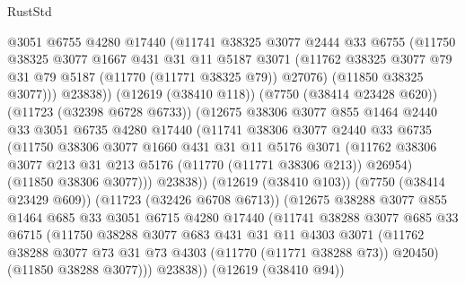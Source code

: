 \begin{lexlean}{RustStd}
\begin{coremodule}
                    @3051
                    @6755
                    @4280
                    @17440
                    (@11741
                      @38325
                      @3077
                      @2444
                      @33
                      @6755
                      (@11750
                        @38325
                        @3077
                        @1667
                        @431
                        @31
                        @11
                        @5187
                        @3071
                        (@11762 @38325 @3077 @79 @31 @79 @5187 (@11770 (@11771 @38325 @79)) @27076)
                        (@11850 @38325 @3077)))
                    @23838))
                (@12619 (@38410 @118))
                (@7750 (@38414 @23428 @620))
                (@11723 (@32398 @6728 @6733))
                (@12675
                  @38306
                  @3077
                  @855
                  @1464
                  @2440
                  @33
                  @3051
                  @6735
                  @4280
                  @17440
                  (@11741
                    @38306
                    @3077
                    @2440
                    @33
                    @6735
                    (@11750
                      @38306
                      @3077
                      @1660
                      @431
                      @31
                      @11
                      @5176
                      @3071
                      (@11762 @38306 @3077 @213 @31 @213 @5176 (@11770 (@11771 @38306 @213)) @26954)
                      (@11850 @38306 @3077)))
                  @23838))
              (@12619 (@38410 @103))
              (@7750 (@38414 @23429 @609))
              (@11723 (@32426 @6708 @6713))
              (@12675
                @38288
                @3077
                @855
                @1464
                @685
                @33
                @3051
                @6715
                @4280
                @17440
                (@11741
                  @38288
                  @3077
                  @685
                  @33
                  @6715
                  (@11750
                    @38288
                    @3077
                    @683
                    @431
                    @31
                    @11
                    @4303
                    @3071
                    (@11762 @38288 @3077 @73 @31 @73 @4303 (@11770 (@11771 @38288 @73)) @20450)
                    (@11850 @38288 @3077)))
                @23838))
            (@12619 (@38410 @94))

\end{coremodule}
\end{lexlean}
